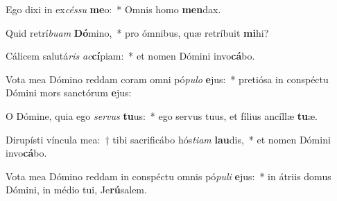 \item Ego dixi in ex\textit{cés}\textit{su} \textbf{me}o:~* Omnis homo \textbf{men}dax.
\item Quid retrí\textit{bu}\textit{am} \textbf{Dó}mino,~* pro ómnibus, quæ retríbuit \textbf{mi}hi?
\item Cálicem salutá\textit{ris} \textit{ac}\textbf{cí}piam:~* et nomen Dómini invo\textbf{cá}bo.
\item Vota mea Dómino reddam coram omni pó\textit{pu}\textit{lo} \textbf{e}jus:~* pretiósa in conspéctu Dómini mors sanctórum \textbf{e}jus:
\item O Dómine, quia ego \textit{ser}\textit{vus} \textbf{tu}us:~* ego servus tuus, et fílius ancíllæ \textbf{tu}æ.
\item Dirupísti víncula mea:~† tibi sacrificábo hós\textit{ti}\textit{am} \textbf{lau}dis,~* et nomen Dómini invo\textbf{cá}bo.
\item Vota mea Dómino reddam in conspéctu omnis pó\textit{pu}\textit{li} \textbf{e}jus:~* in átriis domus Dómini, in médio tui, Je\textbf{rú}salem.
